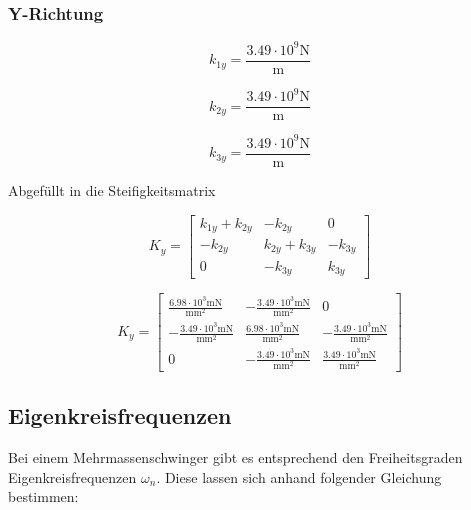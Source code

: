 \documentclass[
  letterpaper,
  DIV=11]{scrreprt}
\begin{document}
\hypertarget{y-richtung-1}{%
\subsubsection{Y-Richtung}\label{y-richtung-1}}

\begin{equation}k_{1 y} = \frac{3.49 \cdot 10^{9} \text{N}}{\text{m}}\end{equation}

\begin{equation}k_{2 y} = \frac{3.49 \cdot 10^{9} \text{N}}{\text{m}}\end{equation}

\begin{equation}k_{3 y} = \frac{3.49 \cdot 10^{9} \text{N}}{\text{m}}\end{equation}

Abgefüllt in die Steifigkeitsmatrix

\begin{equation}K_{y} = \left[\begin{matrix}k_{1 y} + k_{2 y} & - k_{2 y} & 0\\- k_{2 y} & k_{2 y} + k_{3 y} & - k_{3 y}\\0 & - k_{3 y} & k_{3 y}\end{matrix}\right]\end{equation}

\begin{equation}K_{y} = \left[\begin{matrix}\frac{6.98 \cdot 10^{3} \text{m} \text{N}}{\text{mm}^{2}} & - \frac{3.49 \cdot 10^{3} \text{m} \text{N}}{\text{mm}^{2}} & 0\\- \frac{3.49 \cdot 10^{3} \text{m} \text{N}}{\text{mm}^{2}} & \frac{6.98 \cdot 10^{3} \text{m} \text{N}}{\text{mm}^{2}} & - \frac{3.49 \cdot 10^{3} \text{m} \text{N}}{\text{mm}^{2}}\\0 & - \frac{3.49 \cdot 10^{3} \text{m} \text{N}}{\text{mm}^{2}} & \frac{3.49 \cdot 10^{3} \text{m} \text{N}}{\text{mm}^{2}}\end{matrix}\right]\end{equation}

\hypertarget{eigenkreisfrequenzen-7}{%
\subsection{Eigenkreisfrequenzen}\label{eigenkreisfrequenzen-7}}

Bei einem Mehrmassenschwinger gibt es entsprechend den Freiheitsgraden
Eigenkreisfrequenzen \(\omega_n\). Diese lassen sich anhand folgender
Gleichung bestimmen:
\end{document}
